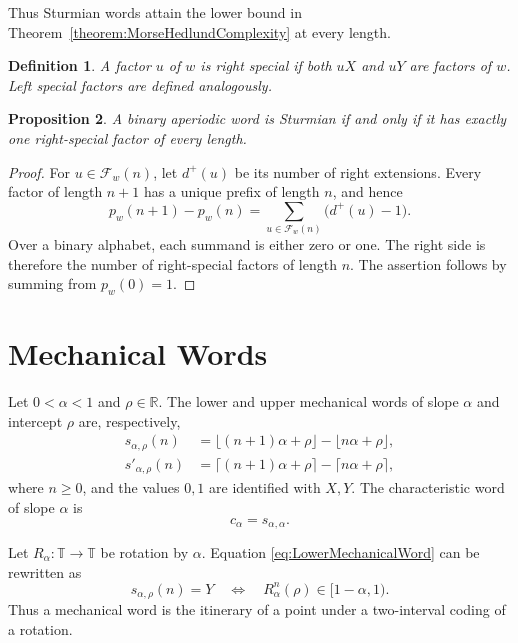 \documentclass{book}
\newtheorem{definition}{Definition}[section]
\newtheorem{proposition}[definition]{Proposition}
\begin{document}
Thus Sturmian words attain the lower bound in
Theorem~\ref{theorem:MorseHedlundComplexity} at every length.

\begin{definition}
  A factor \(u\) of \(w\) is \textnormal{right special} if both \(uX\) and
  \(uY\) are factors of \(w\).  Left special factors are defined
  analogously.
\end{definition}

\begin{proposition}\label{proposition:SturmianUniqueSpecial}
  A binary aperiodic word is Sturmian if and only if it has exactly one
  right-special factor of every length.
\end{proposition}
\begin{proof}
  For \(u\in\mathcal F_w(n)\), let \(d^+(u)\) be its number of right
  extensions.  Every factor of length \(n+1\) has a unique prefix of length
  \(n\), and hence
  \[
    p_w(n+1)-p_w(n)
    =\sum_{u\in\mathcal F_w(n)}\bigl(d^+(u)-1\bigr).
  \]
  Over a binary alphabet, each summand is either zero or one.  The right
  side is therefore the number of right-special factors of length \(n\).
  The assertion follows by summing from \(p_w(0)=1\).
\end{proof}

\section{Mechanical Words}

Let \(0<\alpha<1\) and \(\rho\in\mathbb R\).  The \textnormal{lower} and
\textnormal{upper mechanical words} of slope \(\alpha\) and intercept
\(\rho\) are, respectively,
\begin{align}
  s_{\alpha,\rho}(n)
  &=\lfloor(n+1)\alpha+\rho\rfloor
    -\lfloor n\alpha+\rho\rfloor,\label{eq:LowerMechanicalWord}\\
  s'_{\alpha,\rho}(n)
  &=\lceil(n+1)\alpha+\rho\rceil
    -\lceil n\alpha+\rho\rceil,\label{eq:UpperMechanicalWord}
\end{align}
where \(n\geq0\), and the values \(0,1\) are identified with \(X,Y\).
The \textnormal{characteristic word} of slope \(\alpha\) is
\[
  c_\alpha=s_{\alpha,\alpha}.
\]

Let \(R_\alpha\colon\mathbb T\to\mathbb T\) be rotation by \(\alpha\).
Equation \eqref{eq:LowerMechanicalWord} can be rewritten as
\begin{equation}\label{eq:RotationCoding}
  s_{\alpha,\rho}(n)=Y
  \quad\Longleftrightarrow\quad
  R_\alpha^n(\rho)\in[1-\alpha,1).
\end{equation}
Thus a mechanical word is the itinerary of a point under a two-interval
coding of a rotation.
\end{document}
